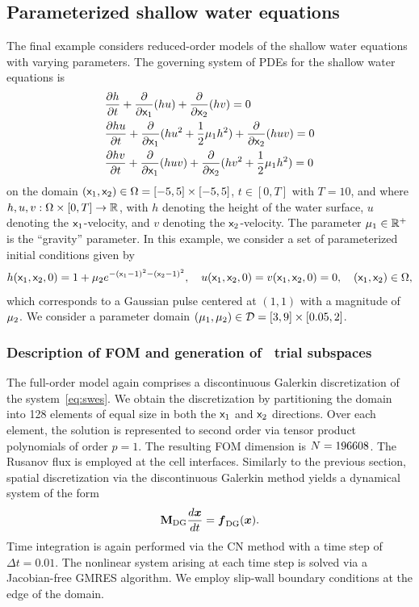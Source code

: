 \subsection{Parameterized shallow water equations}\label{sec:swe}
The final example considers reduced-order models of the shallow water equations with varying parameters. The governing system of PDEs for the shallow water equations is 
\begin{equation}\label{eq:swes}
\begin{split}
&\frac{\partial h}{\partial t} + \frac{\partial}{\partial \mathsf{x}_1 }(  h u) + \frac{\partial}{\partial \mathsf{x}_2 }( h v) = 0\\
&\frac{\partial h u}{\partial t} + \frac{\partial}{\partial \mathsf{x}_1 } (h u^2 + \frac{1}{2} \mu_1 h^2) + \frac{\partial}{\partial \mathsf{x}_2 }( h u v) = 0\\
&\frac{\partial h v}{\partial t} + \frac{\partial}{\partial \mathsf{x}_1 } (h u v) + \frac{\partial}{\partial \mathsf{x}_2 }( h v^2 +  \frac{1}{2} \mu_1 h^2) = 0
\end{split}
\end{equation}
on the domain $(\mathsf{x}_1 ,\mathsf{x}_2 ) \in \Omega = [-5,5] \times [-5,5]$, $t \in [0,T]$
with $T=10$, and 
where $h,u,v: \Omega \times [0,T] \rightarrow \mathbb{R}^{}$, with $h$ denoting the height
of the water surface, $u$ denoting the $\mathsf{x}_1$-velocity, and $v$
denoting the $\mathsf{x}_2$-velocity.
The parameter $\mu_1 \in \mathbb{R}^{+}$ is the ``gravity'' parameter.  In this example, we consider a set of parameterized initial conditions given by 
$$h(\mathsf{x}_1
,\mathsf{x}_2 ,0) = 1 + \mu_2 e^{ -(\mathsf{x}_1  - 1)^2 -
(\mathsf{x}_2  - 1)^2 }, \quad u(\mathsf{x}_1 ,\mathsf{x}_2 ,0) =
v(\mathsf{x}_1 ,\mathsf{x}_2 ,0) = 0,\quad (\mathsf{x}_1 ,\mathsf{x}_2 ) \in
\Omega,$$ which corresponds to a Gaussian pulse centered at $(1,1)$ with
a magnitude of $\mu_2$. We consider a parameter domain
$(\mu_1,\mu_2)\in\mathcal{D} = [3,9]\times [0.05,2]$.

\subsubsection{Description of FOM and generation of \spatialAcronym\ trial subspaces}
The full-order model again comprises a discontinuous Galerkin discretization of the system~\eqref{eq:swes}. We obtain the discretization 
by partitioning the domain into 128 elements of equal size in both the $\mathsf{x}_1$ and $\mathsf{x}_2$ directions. Over each element, 
the solution is represented to second order via tensor product polynomials of order $p=1$. The resulting FOM dimension is $N = 196608$. The Rusanov flux is employed at the cell interfaces. Similarly to the previous section, spatial discretization via the discontinuous Galerkin method yields a dynamical system 
of the form
$$  \mathbf{M}_{\text{DG}}\frac{d \boldsymbol x}{dt} = \boldsymbol f_{\text{DG}} (\boldsymbol x).$$
Time integration 
is again performed via the CN method with a time step of $\Delta t = 0.01$. The nonlinear system arising at each time step is solved via a Jacobian-free 
GMRES algorithm. We employ slip-wall boundary conditions at the edge of the domain. 


